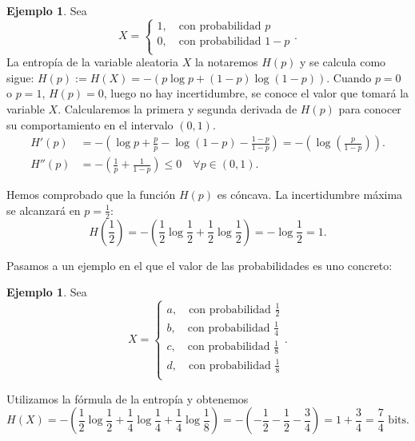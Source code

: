 \documentclass[10pt,a4paper]{article} %
\theoremstyle{definition}
\newtheorem{example}[theorem]{Ejemplo}
\begin{document}
\begin{example}
  Sea \[X = 
     \begin{cases}
       1, \quad\text{con probabilidad } p\\
       0, \quad\text{con probabilidad } 1-p \\
     \end{cases}.\]
     La entropía de la variable aleatoria $X$ la notaremos $H(p)$ y se calcula como sigue: $ H(p) := H(X) = - \left ( p \log p + (1-p) \log (1-p) \right )$.
     Cuando $p=0$ o $p=1$, $H(p) = 0$, luego no hay incertidumbre, se conoce el valor que tomará la variable $X$. Calcularemos la primera y segunda derivada de $H(p)$ para conocer su comportamiento en el intervalo $(0,1)$.
     \begin{align*}
       H'(p) &= - \left ( \log p + \frac{p}{p} - \log(1-p) - \frac{1-p}{1-p} \right ) = - \left ( \log \left (\frac{p}{1-p} \right) \right ).\\
     H''(p) &= - \left ( \frac{1}{p} + \frac{1}{1-p} \right ) \leq 0 \quad \forall p \in (0,1).
     \end{align*}
     
     Hemos comprobado que la función $H(p)$ es cóncava. La incertidumbre máxima se alcanzará en $p=\frac{1}{2}$: \[H\left (\frac{1}{2}\right ) = - \left ( \frac{1}{2}\log\frac{1}{2} + \frac{1}{2} \log\frac{1}{2} \right ) = - \log \frac{1}{2} = 1.\]

\end{example}

Pasamos a un ejemplo en el que el valor de las probabilidades es uno concreto:
\begin{example}
  Sea  \[X = 
     \begin{cases}
       a, \quad\text{con probabilidad } \frac{1}{2}\\
       b, \quad\text{con probabilidad } \frac{1}{4} \\
       c, \quad\text{con probabilidad } \frac{1}{8} \\
       d, \quad\text{con probabilidad } \frac{1}{8} \\
     \end{cases}.\]

     Utilizamos la fórmula de la entropía y obtenemos \[H(X) = - \left (\frac{1}{2} \log \frac{1}{2} + \frac{1}{4} \log \frac{1}{4} + \frac{1}{4} \log \frac{1}{8} \right ) = - \left (-\frac{1}{2} - \frac{1}{2} - \frac{3}{4} \right ) = 1 + \frac{3}{4} = \frac{7}{4} \text{ bits}.\]
\end{example}
\end{document}
